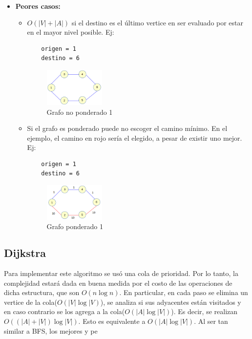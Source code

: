 \documentclass[a4paper,10pt]{article}
\begin{document}
\begin{itemize}
\item \textbf{Peores casos:}
	\begin{itemize}
	\item $O(|V| + |A|)$ si el destino es el último vertice en ser evaluado por estar en el mayor nivel posible. Ej:
	\begin{verbatim}
	origen = 1
	destino = 6
	\end{verbatim}
	\begin{figure}[H]
	\begin{center}
	\includegraphics[width=0.3\textwidth]{./g3.png}
	\caption{Grafo no ponderado 1}
	\label{fig:g3}
	\end{center}
	\end{figure}
	\item Si el grafo es ponderado puede no escoger el camino mínimo. En el ejemplo, el camino en rojo sería el elegido, a pesar de existir uno mejor. Ej:
	\begin{verbatim}
	origen = 1
	destino = 6
	\end{verbatim}
	\begin{figure}[H]
	\begin{center}
	\includegraphics[width=0.3\textwidth]{./g4.png}
	\caption{Grafo ponderado 1}
	\label{fig:g4}
	\end{center}
	\end{figure}
	\end{itemize}
\end{itemize}

\subsection{Dijkstra}

Para implementar este algoritmo se usó una cola de prioridad. Por lo tanto, la complejidad estará dada en buena medida por el costo de las operaciones de dicha estructura, que son $O(n \log{n})$. En particular, en cada paso se elimina un vertice de la cola($O(|V| \log{|V})$), se analiza si sus adyacentes están visitados y en caso contrario se los agrega a la cola($O(|A| \log{|V|})$). Es decir, se realizan $O((|A| + |V|) \log{|V|})$. Esto es equivalente a $O(|A| \log{|V|})$. Al ser tan similar a BFS, los mejores y pe
\end{document}
